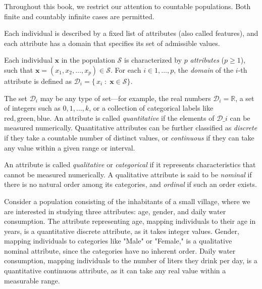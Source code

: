 Throughout this book, we restrict our attention to countable populations. Both finite and countably infinite cases are permitted.

Each individual is described by a fixed list of attributes (also called features), and each attribute has a domain that specifies its set of admissible values.

\begin{definition}
Each individual $\mathbf{x}$ in the population $\mathcal{S}$ is characterized by $p$ \emph{attributes} ($p \ge 1$), such that $\mathbf{x} = (x_{1}, x_{2}, \dots, x_{p}) \in \mathcal{S}$. For each $i \in {1, \dots, p}$, the \emph{domain} of the $i$-th attribute is defined as $\mathcal{D}_{i} = \{\,x_{i}\;:\;\mathbf{x}\in\mathcal{S}\}$.
\end{definition}

The set $\mathcal{D}_i$ may be any type of set—for example, the real numbers $\mathcal{D}_{i} = \mathbb{R}$, a set of integers such as ${0, 1, \dots, k}$, or a collection of categorical labels like ${\text{red}, \text{green}, \text{blue}}$. An attribute is called \emph{quantitative} if the elements of $\mathcal{D}\_i$ can be measured numerically. Quantitative attributes can be further classified as \emph{discrete} if they take a countable number of distinct values, or \emph{continuous} if they can take any value within a given range or interval.

An attribute is called \emph{qualitative} or \emph{categorical} if it represents characteristics that cannot be measured numerically. A qualitative attribute is said to be \emph{nominal} if there is no natural order among its categories, and \emph{ordinal} if such an order exists.

\begin{example}
Consider a population consisting of the inhabitants of a small village, where we are interested in studying three attributes: age, gender, and daily water consumption. The attribute representing age, mapping individuals to their age in years, is a quantitative discrete attribute, as it takes integer values. Gender, mapping individuals to categories like "Male" or "Female," is a qualitative nominal attribute, since the categories have no inherent order. Daily water consumption, mapping individuals to the number of liters they drink per day, is a quantitative continuous attribute, as it can take any real value within a measurable range.
\end{example}

